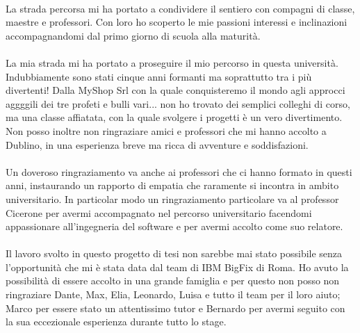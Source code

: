 \paragraph{}
La strada percorsa mi ha portato a condividere il sentiero con compagni di classe, maestre e professori. Con loro ho scoperto le mie passioni interessi e inclinazioni accompagnandomi dal primo giorno di scuola alla maturità.

\paragraph{}
La mia strada mi ha portato a proseguire il mio percorso in questa università. Indubbiamente sono stati cinque anni formanti ma soprattutto tra i più divertenti! Dalla MyShop Srl con la quale conquisteremo il mondo agli approcci aggggili dei tre profeti e bulli vari... non ho trovato dei semplici colleghi di corso, ma una classe affiatata, con la quale svolgere i progetti è un vero divertimento. Non posso inoltre non ringraziare amici e professori che mi hanno accolto a Dublino, in una esperienza breve ma ricca di avventure e soddisfazioni.

\paragraph{}
Un doveroso ringraziamento va anche ai professori che ci hanno formato in questi anni, instaurando un rapporto di empatia che raramente si incontra in ambito universitario. In particolar modo un ringraziamento particolare va al professor Cicerone per avermi accompagnato nel percorso universitario facendomi appassionare all'ingegneria del software e per avermi accolto come suo relatore.

\paragraph{}
Il lavoro svolto in questo progetto di tesi non sarebbe mai stato possibile senza l'opportunità che mi è stata data dal team di IBM BigFix di Roma. Ho avuto la possibilità di essere accolto in una grande famiglia e per questo non posso non ringraziare Dante, Max, Elia, Leonardo, Luisa e tutto il team per il loro aiuto; Marco per essere stato un attentissimo tutor e Bernardo per avermi seguito con la sua eccezionale esperienza durante tutto lo stage.

\paragraph{}